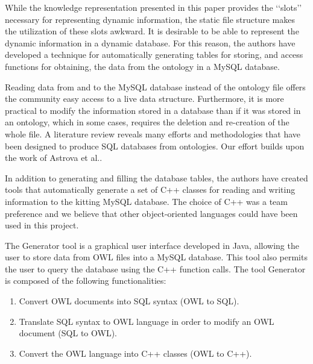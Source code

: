 While the knowledge representation presented in this paper provides the \lq\lq{}slots\rq\rq{} necessary for representing dynamic information, the
static file structure makes the utilization of these slots awkward. It is desirable to be able to represent the dynamic information in a dynamic database.
For this reason, the authors have developed a technique for automatically generating tables for storing,  and access functions
for obtaining, the data from the ontology in a MySQL database.

Reading data from and to the MySQL database instead of the ontology file offers the community easy access to a live data structure. Furthermore, it is more practical to modify the information stored in a database than if it was stored in an ontology, which in some cases, requires the deletion and re-creation of the whole file. A literature review reveals many efforts and methodologies that have been designed to produce SQL databases from ontologies. Our effort builds upon the work of Astrova et al.\cite{Astrova2007}. 

In addition to generating and filling the database tables, the authors have created tools that automatically generate a set of C++ classes for reading and writing
information to the kitting MySQL database. The choice of C++ was a team preference and we believe that other object-oriented languages could have been used in this project.

The Generator tool is a graphical user interface developed in Java, allowing the user to store data from OWL files into a MySQL database. This tool also permits the user to query the database using the C++ function calls. The tool Generator is composed of the following functionalities:
\begin{enumerate}
 \item Convert OWL documents into SQL syntax (OWL to SQL).
 \item Translate SQL syntax to OWL language in order to modify an OWL document (SQL to OWL).
 \item Convert the OWL language into C++ classes (OWL to C++).
\end{enumerate}

